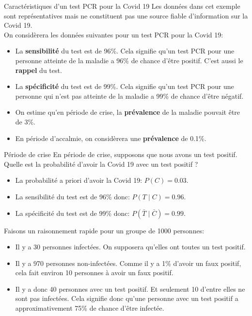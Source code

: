 \documentclass[10pt]{beamer}  %
\begin{document}
\begin{frame}{Caractéristiques d'un test PCR pour la Covid 19}
	\faExclamationTriangle Les données dans cet exemple sont représentatives mais ne constituent pas une source fiable d'information sur la Covid 19. \\
	\vspace{0.5cm}
	\pause
	On considèrera les données suivantes pour un test PCR pour la Covid 19:
	\begin{itemize}
		\item La \textbf{sensibilité} du test est de 96\%. Cela signifie qu'un test PCR pour une personne atteinte de la maladie a 96\% de chance d'être positif. C'est aussi le \textbf{rappel} du test.
		\pause
		\item La \textbf{spécificité} du test est de 99\%. Cela signifie qu'un test PCR pour une personne qui n'est pas atteinte de la maladie a 99\% de chance d'être négatif.
		\pause
		\item On estime qu'en période de crise, la \textbf{prévalence} de la maladie pouvait être de 3\%.
		\pause
		\item En période d'accalmie, on considèrera une \textbf{prévalence} de 0.1\%.
	\end{itemize}
\end{frame}

\begin{frame}{Période de crise}
	En période de crise, supposons que nous avons un test positif. Quelle est la probabilité d'avoir la Covid 19 avec un test positif ?
	\begin{itemize}
		\item La probabilité a priori d'avoir la Covid 19: $P(C) = 0.03$. 
		\item La sensibilité du test est de 96\% donc: $P(T \mid C) = 0.96$.
		\item La spécificité du test est de 99\% donc: $P(\bar{T} \mid \bar{C}) = 0.99$.
	\end{itemize}
	\vspace{0.5cm}
	\pause
	Faisons un raisonnement rapide pour un groupe de 1000 personnes:
	\begin{itemize}
		\item Il y a 30 personnes infectées. On supposera qu'elles ont toutes un test positif.
		\pause
		\item Il y a 970 personnes non-infectées. Comme il y a 1\% d'avoir un faux positif, cela fait environ 10 personnes à avoir un faux positif.
		\pause
		\item Il y a donc 40 personnes avec un test positif. Et seulement 10 d'entre elles ne sont pas infectées. Cela signifie donc qu'une personne avec un test positif a approximativement 75\% de chance d'être infectée.
	\end{itemize}
\end{frame}
\end{document}
